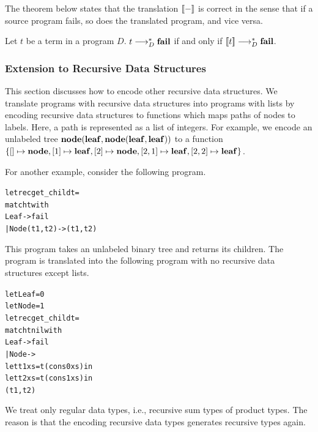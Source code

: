 The theorem below states that the translation $[\![{-}]\!]$ is correct in
the sense that if a source program fails, so does the translated program, and vice versa.
\begin{theorem}
  \label{th:translation-list-correct}
  Let $t$ be a term in a program $D$.
  $t \longrightarrow_{D}^* \mathbf{fail}$ if and only if $[\![{t}]\!] \longrightarrow_{D}^* \mathbf{fail}$.
\end{theorem}



\subsubsection{Extension to Recursive Data Structures}
This section discusses how to encode other recursive data structures.
We translate programs with recursive data structures into programs
with lists by encoding recursive data structures to functions which maps
paths of nodes to labels.  Here, a path is represented as a list of integers.
For example, we encode an unlabeled tree
$\mathbf{node}({\mathbf{leaf}},{\mathbf{node}({\mathbf{leaf}},{\mathbf{leaf}})})$ to a function
$\{[] \mapsto \mathbf{node}, [1] \mapsto \mathbf{leaf}, [2] \mapsto \mathbf{node}, [2,1] \mapsto \mathbf{leaf}, [2,2] \mapsto \mathbf{leaf}\}$.

For another example, consider the following program.
\begin{alltt}
let rec get_child t =
  match t with
    Leaf -> fail
  | Node(t1,t2) -> (t1, t2)
\end{alltt}
This program takes an unlabeled binary tree and returns its children.
The program is translated into the following program with no recursive
data structures except lists.
\begin{alltt}
let Leaf = 0
let Node = 1
let rec get_child t =
  match t nil with
    Leaf -> fail
  | Node ->
      let t1 xs = t (cons 0 xs) in
      let t2 xs = t (cons 1 xs) in
        (t1, t2)
\end{alltt}

We treat only regular data types, i.e., recursive sum types of product types.
The reason is that the encoding recursive data types generates recursive types again.

